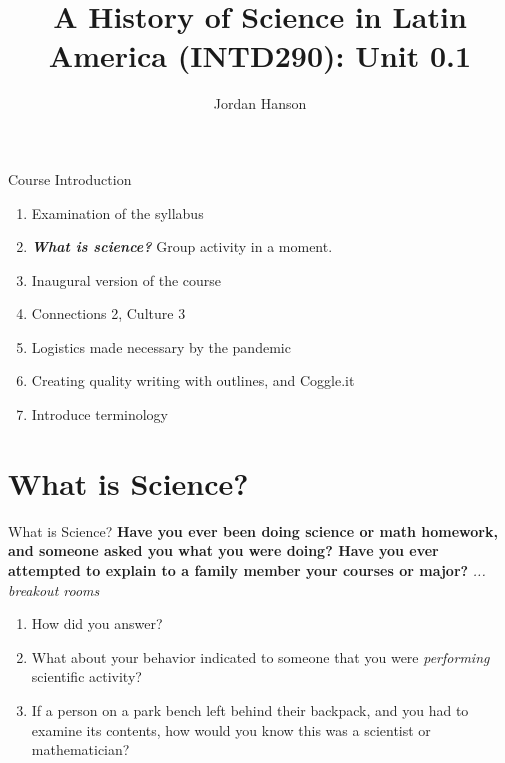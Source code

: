 \documentclass{beamer}
\title{A History of Science in Latin America (INTD290): Unit 0.1}
\author{Jordan Hanson}
\institute{Whittier College Department of Physics and Astronomy}
\begin{document}
\maketitle

\begin{frame}{Course Introduction}
\begin{enumerate}
\item Examination of the syllabus
\item \textit{\textbf{\alert{What is science?}}} Group activity in a moment.
\item Inaugural version of the course
\item Connections 2, Culture 3
\item Logistics made necessary by the pandemic
\item Creating quality writing with outlines, and Coggle.it
\item Introduce terminology
\end{enumerate}
\end{frame}

\section{What is Science?}

\begin{frame}{What is Science?}
\textbf{Have you ever been doing science or math homework, and someone asked you what you were doing?  Have you ever attempted to explain to a family member your courses or major?} \textit{... breakout rooms}
\begin{enumerate}
\item How did you answer?
\item What about your behavior indicated to someone that you were \textit{performing} scientific activity?
\item If a person on a park bench left behind their backpack, and you had to examine its contents, how would you know this was a scientist or mathematician?
\end{enumerate}
\end{frame}
\end{document}
